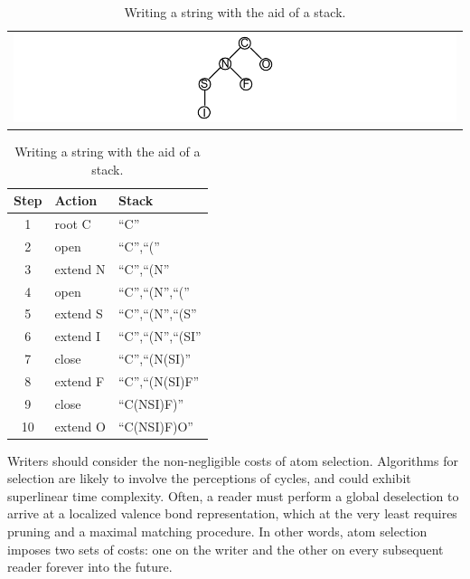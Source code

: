 \documentclass{article}
\begin{document}
\begin{table}
    \caption{Writing a string with the aid of a stack.}
    \centering
    \begin{tabular}{c}
        \includegraphics[width=\columnwidth]{tree-for-stack.pdf}
    \end{tabular}

    \bigskip

    \begin{tabular}{c l l}
        \hline
        Step & Action & Stack \\
        \hline
        1  & root C   & \enquote{C}                             \\
        2  & open     & \enquote{C},\enquote{(}                 \\
        3  & extend N & \enquote{C},\enquote{(N}                \\
        4  & open     & \enquote{C},\enquote{(N},\enquote{(}    \\
        5  & extend S & \enquote{C},\enquote{(N},\enquote{(S}   \\
        6  & extend I & \enquote{C},\enquote{(N},\enquote{(SI}  \\
        7  & close    & \enquote{C},\enquote{(N(SI)}            \\
        8  & extend F & \enquote{C},\enquote{(N(SI)F}           \\
        9  & close    & \enquote{C(NSI)F)}                      \\
        10 & extend O & \enquote{C(NSI)F)O}                     \\
        \hline
    \end{tabular}
    \label{table:stack-for-writing-string}
\end{table}

Writers should consider the non-negligible costs of atom selection. Algorithms for selection are likely to involve the perceptions of cycles, and could exhibit superlinear time complexity. Often, a reader must perform a global deselection to arrive at a localized valence bond representation, which at the very least requires pruning and a maximal matching procedure. In other words, atom selection imposes two sets of costs: one on the writer and the other on every subsequent reader forever into the future.
\end{document}
